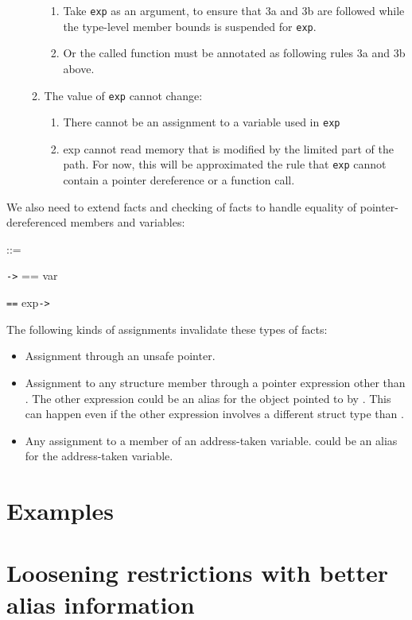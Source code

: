 \begin{enumerate}
\begin{enumerate}
    \begin{enumerate}
    \item
      Take \texttt{exp} as an argument, to ensure that 3a and 3b are
      followed while the type-level member bounds is suspended for
      \texttt{exp}.
    \item
      Or the called function must be annotated as following rules 3a and
      3b above.
    \end{enumerate}
  \item
    The value of \texttt{exp} cannot change:

    \begin{enumerate}
    \item
      There cannot be an assignment to a variable used in \texttt{exp}
    \item
      exp cannot read memory that is modified by the limited part of the
      path. For now, this will be approximated the rule that
      \texttt{exp} cannot contain a pointer dereference or a function
      call.
    \end{enumerate}
  \end{enumerate}
\end{enumerate}

We also need to extend facts and checking of facts to handle equality of
pointer-dereferenced members and variables:

 ::=

\texttt{-\textgreater{}} == var

 \texttt{==} exp\texttt{-\textgreater{}}

The following kinds of assignments invalidate these types of facts:

\begin{itemize}
\item
  Assignment through an unsafe pointer.
\item
  Assignment to any structure member through a pointer expression other
  than . The other expression could be an alias for the object
  pointed to by . This can happen even if the other expression
  involves a different struct type than .
\item
  Any assignment to a member of an address-taken variable. 
  could be an alias for the address-taken variable.
\end{itemize}

\section{Examples}\label{examples-1}
\section{Loosening restrictions with better alias information}\label{loosening-restrictions-with-better-alias-information}